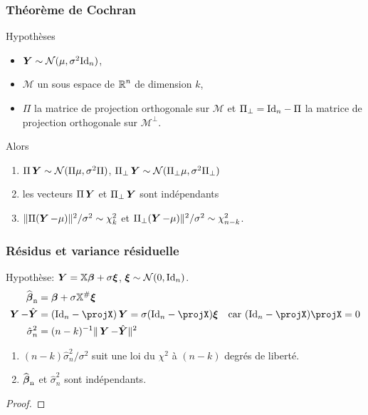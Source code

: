 \begin{frame}
\frametitle{Théorème de Cochran}
\begin{theo}
\alert{Hypothèses}
\begin{itemize}
\item $\operatorname{\boldsymbol{Y}} \sim \mathcal{N}(\mu,\sigma^2 \mathrm{Id}_{n})$,
\item $\mathcal{M}$ un sous espace de $\operatorname{{\mathbb R}}^n$ de dimension $k$,
\item $\Pi$ la matrice de projection orthogonale
sur $\mathcal{M}$ et $\Pi_{\perp}= \mathrm{Id}_{n} - \Pi$ la matrice de projection orthogonale sur $\mathcal{M}^\perp$.
\end{itemize}
Alors
\begin{enumerate}
\item \alert<1>{$\Pi \operatorname{\boldsymbol{Y}} \sim \mathcal{N}(\Pi \mu, \sigma^2 \Pi)$, $\Pi_\perp \operatorname{\boldsymbol{Y}} \sim \mathcal{N}(\Pi_{\perp} \mu, \sigma^2 \Pi_{\perp})$}
\item \alert<2>{les vecteurs $\Pi \operatorname{\boldsymbol{Y}}$ et $\Pi_\perp \operatorname{\boldsymbol{Y}}$ sont indépendants}
\item \alert<3>{$\| \Pi(\operatorname{\boldsymbol{Y}} - \mu) \|^2 / \sigma^2 \sim \chi^2_k$ et $\Pi_\perp(\operatorname{\boldsymbol{Y}}-\mu) \|^2/\sigma^2 \sim \chi^2_{n-k}$}.
\end{enumerate}
\end{theo}
\end{frame}

\begin{frame}
\frametitle{Résidus et variance résiduelle}
\alert{Hypothèse:} $\operatorname{\boldsymbol{Y}}= \mathbb{X} \boldsymbol{\beta} +  \sigma \boldsymbol{\xi}$, $\boldsymbol{\xi} \sim \mathcal{N}(0,\mathrm{Id}_{n})$.
\begin{align*}
\estregress    &=  \truebeta + \sigma \regressmat^{\#} \bnoise \\
\bY - \predY   &=  (\Id{n}-\projX) \bY = \sigma (\Id{n} - \projX) \bnoise \quad \text{car $(\Id{n} - \projX) \projX= 0$} \\
\hat{\sigma}_n^2 &= (n-k)^{-1} \| \bY - \predY \|^2
\end{align*}
\begin{theorem}
\begin{enumerate}
\item $(n-k) \hat{\sigma}_n^2/\sigma^2$ suit une loi du $\chi^2$ à $(n-k)$ degrés de liberté.
\item $\operatorname{\widehat{\boldsymbol{\beta}}_n}$ et $\hat{\sigma}_n^2$ sont indépendants.
\end{enumerate}
\end{theorem}
\begin{proof}
\end{proof}
\end{frame}

